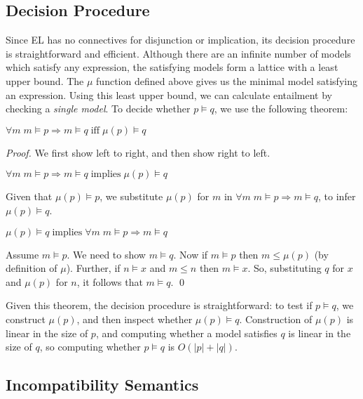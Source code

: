 \subsection{Decision Procedure}
Since EL has no connectives for disjunction or implication, its decision procedure is straightforward and efficient. 
Although there are an infinite number of models which satisfy any expression, the satisfying models form a lattice with a least upper bound. 
The $\mu$ function defined above gives us the minimal model satisfying an expression.
Using this least upper bound, we can calculate entailment by checking a \emph{single model}.
To decide whether $p \models q$,  we use the following theorem:
\begin{theorem} $\forall m \; m \models p \Rightarrow m \models q \; \text{iff} \; \mu(p) \models q $
\end{theorem}
\begin{proof}
We first show left to right, and then show right to left.
\setcounter{mycase}{0}
\begin{mycase}
$\forall m \; m \models p \Rightarrow m \models q \; \text{implies} \; \mu(p) \models q$
\end{mycase}
Given that $\mu(p) \models p$, we substitute $\mu(p)$ for $m$ in $\forall m \; m \models p \Rightarrow m \models q$, to infer $\mu(p) \models q$.
\begin{mycase}
$\mu(p) \models q \; \text{implies} \; \forall m \; m \models p \Rightarrow m \models q$
\end{mycase}
Assume $m \models p$. We need to show $m \models q$.
Now if $m \models p$ then $m \leq \mu(p)$ (by definition of $\mu$).
Further, if $n \models x$ and $m \leq n$ then $m \models x$. So, substituting $q$ for $x$ and $\mu(p)$ for $n$, it follows that $m \models q$. 
\qed
\end{proof}
Given this theorem, the decision procedure is straightforward: to test if $p \models q$, we construct $\mu(p)$, and then inspect whether $\mu(p) \models q$.
Construction of $\mu(p)$ is linear in the size of $p$, and computing whether a model satisfies $q$ is linear in the size of $q$, so computing whether $p \models q$ is $O(|p|+|q|)$.




\subsection{Incompatibility Semantics}

